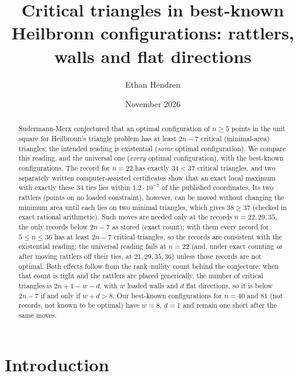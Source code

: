 \documentclass[11pt]{amsart}
\theoremstyle{definition}
\begin{document}
\title[Critical triangles in Heilbronn configurations]{Critical triangles in best-known Heilbronn configurations: rattlers, walls and flat directions}

\author{Ethan Hendren}

\date{November 2026}

\begin{abstract}
Sudermann-Merx conjectured that an optimal configuration of $n \ge 5$ points in the unit square for Heilbronn's triangle problem has at least $2n-7$ critical (minimal-area) triangles; the intended reading is existential (\emph{some} optimal configuration). We compare this reading, and the universal one (\emph{every} optimal configuration), with the best-known configurations. The record for $n = 22$ has exactly $34 < 37$ critical triangles, and two separately written computer-assisted certificates show that an exact local maximum with exactly these 34 ties lies within $1.2\cdot10^{-7}$ of the published coordinates. Its two rattlers (points on no loaded constraint), however, can be moved without changing the minimum area until each lies on two minimal triangles, which gives $38 \ge 37$ (checked in exact rational arithmetic). Such moves are needed only at the records $n = 22, 29, 35$, the only records below $2n-7$ as stored (exact count); with them every record for $5 \le n \le 36$ has at least $2n-7$ critical triangles, so the records are consistent with the existential reading; the universal reading fails at $n = 22$ (and, under exact counting or after moving rattlers off their ties, at $21, 29, 35, 36$) unless those records are not optimal. Both effects follow from the rank--nullity count behind the conjecture: when that count is tight and the rattlers are placed generically, the number of critical triangles is $2n + 1 - w - d$, with $w$ loaded walls and $d$ flat directions, so it is below $2n-7$ if and only if $w + d > 8$. Our best-known configurations for $n = 40$ and $81$ (not records, not known to be optimal) have $w = 8$, $d = 1$ and remain one short after the same moves.
\end{abstract}

\maketitle

\section{Introduction}
\end{document}
